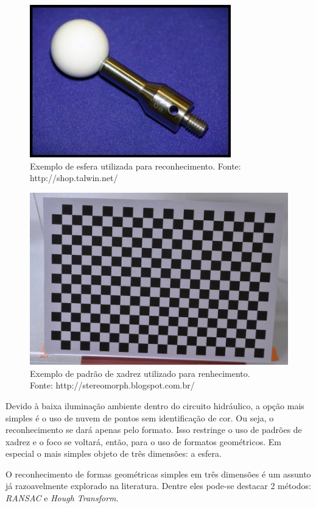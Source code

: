 \begin{figure}[h!]
   \centering
   \includegraphics[width=0.7\columnwidth]{method/figs/calibracao/sphere_rec}
   \caption{Exemplo de esfera utilizada para reconhecimento. Fonte:
   http://shop.talwin.net/}
   \label{fig::sphere_rec}
\end{figure}



\begin{figure}[h!]
   \centering
   \includegraphics[width=0.7\columnwidth]{method/figs/calibracao/checkerboard_rec}
   \caption{Exemplo de padrão de xadrez utilizado para renhecimento.\\ Fonte:
   http://stereomorph.blogspot.com.br/}
   \label{fig::checkerboard_rec}
\end{figure}


Devido à baixa iluminação ambiente dentro do circuito hidráulico, a opção
mais simples é o uso de nuvem de pontos sem identificação de cor. Ou seja, o
reconhecimento se dará apenas pelo formato. Isso restringe o uso de padrões de
xadrez e o foco se voltará, então, para o uso de formatos geométricos. Em
especial o mais simples objeto de três dimensões: a esfera.

O reconhecimento de formas geométricas simples em três dimensões é um assunto
já razoavelmente explorado na literatura. Dentre eles pode-se destacar 2
métodos: \textit{RANSAC} e \textit{Hough Transform}.

